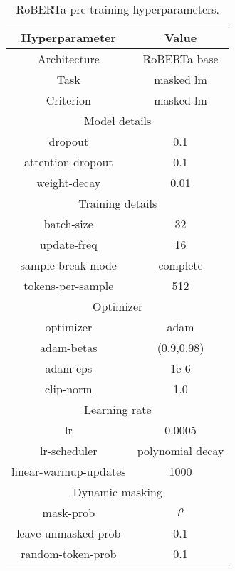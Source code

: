 \begin{table}[!h]
	\caption{RoBERTa pre-training hyperparameters.}
	\vspace*{-2ex}
	\label{tab:roberta_pretrain}
	\begin{center}
		\begin{tabular}{|c|c|}
			\hline
			Hyperparameter\cellcolor[gray]{0.6} & Value \cellcolor[gray]{0.6} \\ \hline
Architecture & RoBERTa base \\ \hline 
Task& masked lm \\ \hline 
Criterion & masked lm \\ \hline 
\multicolumn{2}{|c|}{\cellcolor[gray]{0.9} Model details}\\ \hline 
dropout & 0.1 \\ \hline 
attention-dropout & 0.1 \\ \hline 
weight-decay & 0.01 \\ \hline 
\multicolumn{2}{|c|}{\cellcolor[gray]{0.9} Training details}\\ \hline 
batch-size & 32 \\ \hline 
update-freq & 16 \\ \hline 
sample-break-mode & complete \\ \hline 
tokens-per-sample & 512 \\ \hline  
\multicolumn{2}{|c|}{\cellcolor[gray]{0.9} Optimizer } \\ \hline 
optimizer &adam \\ \hline 
adam-betas & (0.9,0.98) \\ \hline 
adam-eps & 1e-6 \\ \hline 
clip-norm & 1.0 \\ \hline 
\multicolumn{2}{|c|}{\cellcolor[gray]{0.9} Learning rate} \\ \hline 
lr &0.0005 \\ \hline 
lr-scheduler & polynomial decay \\ \hline 
linear-warmup-updates & 1000 \\ \hline 
\multicolumn{2}{|c|}{\cellcolor[gray]{0.9} Dynamic masking } \\ \hline 
mask-prob & $\rho$ \\ \hline 
leave-unmasked-prob & 0.1 \\ \hline 
random-token-prob & 0.1 \\ \hline 
		\end{tabular}
	\end{center}
\end{table}